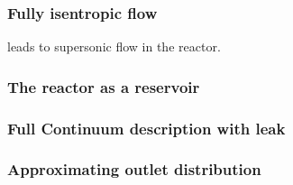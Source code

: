 \subsubsection{Fully isentropic flow}
leads to supersonic flow in the reactor. 

\newpage

\subsubsection{The reactor as a reservoir}

\newpage

\subsubsection{Full Continuum description with leak}

\newpage

\subsubsection{Approximating outlet distribution}
